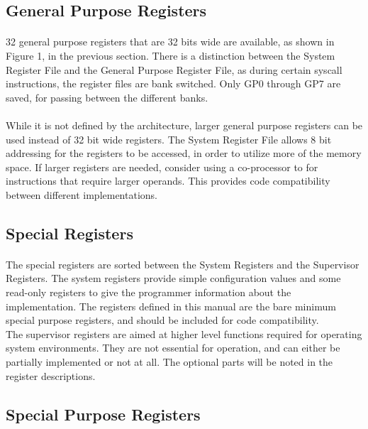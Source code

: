 \documentclass[letterpaper, 11pt]{article}
\begin{document}
\subsection{General Purpose Registers}
\paragraph{}32 general purpose registers that are 32 bits wide are available, as shown in Figure 1, in the previous section. 
There is a distinction between the System Register File and the General Purpose Register File, as during certain syscall
instructions, the register files are bank switched. Only GP0 through GP7 are saved, for passing between the different banks. 

\paragraph{}While it is not defined by the architecture, larger general purpose registers can be used instead of 32 bit wide registers. The System Register File allows 8 bit addressing for the registers to be accessed, in order to utilize more of the memory space.
If larger registers are needed, consider using a co-processor to for instructions that require larger operands. 
This provides code compatibility between different implementations.
\subsection{Special Registers}
\paragraph{}The special registers are sorted between the System Registers and the Supervisor Registers. The system registers provide
simple configuration values and some read-only registers to give the programmer information about the implementation.
The registers defined in this manual are the bare minimum special purpose registers, and
should be included for code compatibility. \\
The supervisor registers are aimed at higher level functions required for operating system environments. They are not essential for operation,
and can either be partially implemented or not at all. The optional parts will be noted in the register descriptions.\\

\subsection{Special Purpose Registers}
\end{document}
